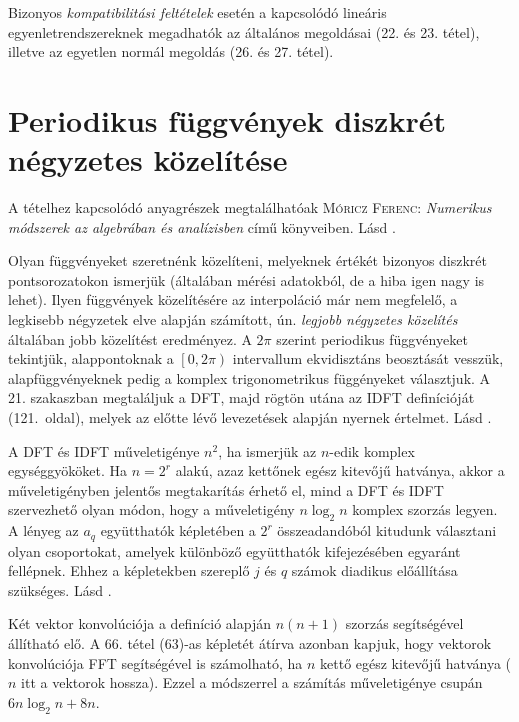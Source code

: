 \documentclass[DIV=15,appendixprefix]{scrreprt}
\theoremstyle{definition}
\theoremstyle{remark}
\begin{document}
Bizonyos \emph{kompatibilitási feltételek} esetén a kapcsolódó lineáris egyenletrendszereknek
megadhatók az általános megoldásai (22. és 23. tétel), illetve az egyetlen normál megoldás (26. és 27. tétel).
%
\section{Periodikus függvények diszkrét négyzetes közelítése}
A tételhez kapcsolódó anyagrészek megtalálhatóak \textsc{Móricz Ferenc}: \emph{Numerikus módszerek
az algebrában és analízisben} \cite[V. fejezet, 21. és 22. szakaszok]{Moricz1997} című könyveiben.
%
Lásd \cite[V. fejezet, 21. szakasz]{Moricz1997}.

Olyan függvényeket szeretnénk közelíteni, melyeknek értékét bizonyos diszkrét pontsorozatokon
ismerjük (általában mérési adatokból, de a hiba igen nagy is lehet). Ilyen függvények közelítésére
az interpoláció már nem megfelelő, a legkisebb négyzetek elve alapján számított, ún. \emph{legjobb
négyzetes közelítés} általában jobb közelítést eredményez. A $ 2 \pi $ szerint periodikus
függvényeket tekintjük, alappontoknak a $ \left.\left[0,{} 2 \pi \right)\right. $ intervallum
ekvidisztáns beosztását vesszük, alapfüggvényeknek pedig a komplex trigonometrikus függényeket
választjuk. A 21. szakaszban megtaláljuk a DFT, majd rögtön utána az IDFT definícióját (121.~oldal),
melyek az előtte lévő levezetések alapján nyernek értelmet.
%
Lásd \cite[V. fejezet, 22. szakasz első fele]{Moricz1997}.

A DFT és IDFT műveletigénye $ n^{ 2 } $, ha ismerjük az $ n $-edik komplex egységgyököket. Ha
$ n = 2^{ r } $ alakú, azaz kettőnek egész kitevőjű hatványa, akkor a műveletigényben jelentős
megtakarítás érhető el, mind a DFT és IDFT szervezhető olyan módon, hogy a műveletigény $ n \log_2
n $ komplex szorzás legyen. A lényeg az $ a_{ q } $ együtthatók képletében a $ 2^{ r } $
összeadandóból kitudunk választani olyan csoportokat, amelyek különböző együtthatók kifejezésében
egyaránt fellépnek. Ehhez a képletekben szereplő $ j $ és $ q $ számok diadikus előállítása
szükséges.
%
Lásd \cite[V. fejezet, 22. szakasz második fele]{Moricz1997}.

Két vektor konvolúciója a definíció alapján $ n \left( n + 1 \right) $ szorzás segítségével
állítható elő. A 66. tétel (63)-as képletét átírva azonban kapjuk, hogy vektorok konvolúciója FFT
segítségével is számolható, ha $ n $ kettő egész kitevőjű hatványa ($ n $ itt a vektorok hossza).
Ezzel a módszerrel a számítás műveletigénye csupán $ 6 n \log_{ 2 } n + 8 n $.
%
\end{document}
